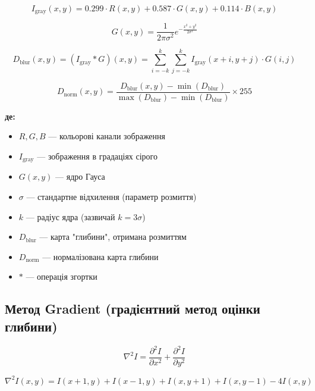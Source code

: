 \documentclass[14pt, a4paper]{extarticle}
\numberwithin{equation}{section}
\begin{document}
\begin{equation}
\boxed{I_{\text{gray}}(x,y) = 0.299 \cdot R(x,y) + 0.587 \cdot G(x,y) + 0.114 \cdot B(x,y)} \tag{22}
\end{equation}

\begin{equation}
\boxed{G(x,y) = \frac{1}{2\pi\sigma^2} e^{-\frac{x^2 + y^2}{2\sigma^2}}} \tag{23}
\end{equation}

\begin{equation}
\boxed{D_{\text{blur}}(x,y) = (I_{\text{gray}} * G)(x,y) = \sum_{i=-k}^{k} \sum_{j=-k}^{k} I_{\text{gray}}(x+i, y+j) \cdot G(i,j)} \tag{24}
\end{equation}

\begin{equation}
\boxed{D_{\text{norm}}(x,y) = \frac{D_{\text{blur}}(x,y) - \min(D_{\text{blur}})}{\max(D_{\text{blur}}) - \min(D_{\text{blur}})} \times 255} \tag{25}
\end{equation}

\textbf{де:}
\begin{itemize}
\item $R, G, B$ — кольорові канали зображення
\item $I_{\text{gray}}$ — зображення в градаціях сірого
\item $G(x,y)$ — ядро Гауса
\item $\sigma$ — стандартне відхилення (параметр розмиття)
\item $k$ — радіус ядра (зазвичай $k = 3\sigma$)
\item $D_{\text{blur}}$ — карта "глибини", отримана розмиттям
\item $D_{\text{norm}}$ — нормалізована карта глибини
\item $*$ — операція згортки
\end{itemize}

\subsection{Метод Gradient (градієнтний метод оцінки глибини)}

\begin{equation}
\boxed{\nabla^2 I = \frac{\partial^2 I}{\partial x^2} + \frac{\partial^2 I}{\partial y^2}} \tag{26}
\end{equation}

\begin{equation}
\nabla^2 I(x,y) = I(x+1,y) + I(x-1,y) + I(x,y+1) + I(x,y-1) - 4I(x,y) \tag{27}
\end{equation}
\end{document}
